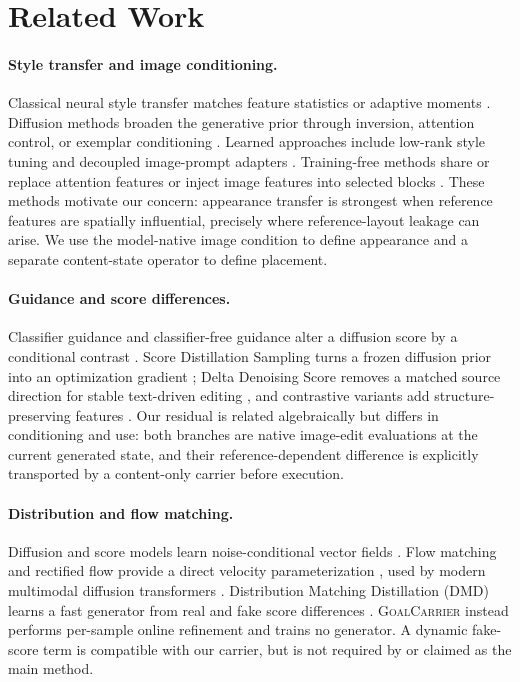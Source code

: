 \documentclass[10pt,letterpaper]{article}
\newcommand{\method}{\textsc{GoalCarrier}}
\begin{document}
\section{Related Work}

\paragraph{Style transfer and image conditioning.}
Classical neural style transfer matches feature statistics or adaptive moments
\cite{gatys2016style,huang2017adain}. Diffusion methods broaden the generative
prior through inversion, attention control, or exemplar conditioning
\cite{hertz2023prompt,tumanyan2023plugplay,yang2023paint}. Learned approaches
include low-rank style tuning and decoupled image-prompt adapters
\cite{sohn2023styledrop,ye2023ipadapter}. Training-free methods share or replace
attention features \cite{chung2024styleinjection,hertz2024stylealigned} or
inject image features into selected blocks \cite{wang2024instantstyle}. These
methods motivate our concern: appearance transfer is strongest when reference
features are spatially influential, precisely where reference-layout leakage
can arise. We use the model-native image condition to define appearance and a
separate content-state operator to define placement.

\paragraph{Guidance and score differences.}
Classifier guidance and classifier-free guidance alter a diffusion score by a
conditional contrast \cite{dhariwal2021diffusion,ho2022cfg}. Score Distillation
Sampling turns a frozen diffusion prior into an optimization gradient
\cite{poole2023dreamfusion}; Delta Denoising Score removes a matched source
direction for stable text-driven editing \cite{hertz2023dds}, and contrastive
variants add structure-preserving features \cite{nam2024cds}. Our residual is
related algebraically but differs in conditioning and use: both branches are
native image-edit evaluations at the current generated state, and their
reference-dependent difference is explicitly transported by a content-only
carrier before execution.

\paragraph{Distribution and flow matching.}
Diffusion and score models learn noise-conditional vector fields
\cite{ho2020ddpm,song2021sde}. Flow matching and rectified flow provide a direct
velocity parameterization \cite{lipman2023flow,liu2023rectified}, used by modern
multimodal diffusion transformers \cite{esser2024sd3}. Distribution Matching
Distillation (DMD) learns a fast generator from real and fake score differences
\cite{yin2024dmd,yin2024dmd2}. \method{} instead performs per-sample online
refinement and trains no generator. A dynamic fake-score term is compatible
with our carrier, but is not required by or claimed as the main method.
\end{document}
